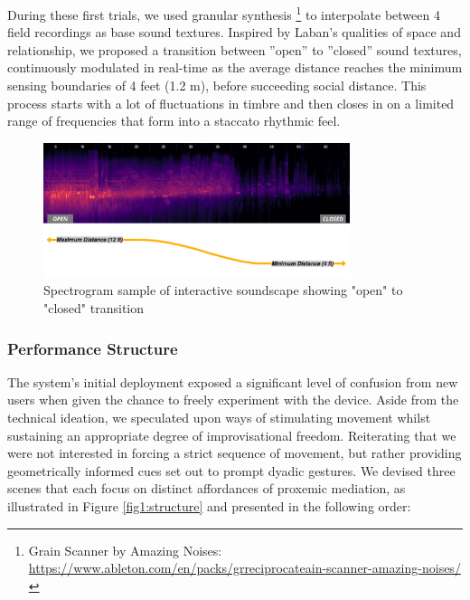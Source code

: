 During these first trials, we used granular synthesis \footnote{{Grain Scanner
by Amazing Noises: \url{https://www.ableton.com/en/packs/grreciprocateain-scanner-amazing-noises/}}} to interpolate between 4 field recordings as base sound textures. Inspired by Laban’s qualities of space and relationship, we proposed a transition between ”open” to ”closed” sound textures, continuously modulated in real-time as the average distance reaches the minimum sensing boundaries of 4 feet (1.2 m), before succeeding social distance. This process starts with a lot of fluctuations in timbre and then closes in on a limited range of frequencies that form into a staccato rhythmic feel.

\begin{figure}[!h]
\captionsetup{width=1.0\textwidth}
\centering
\includegraphics[width=0.8\textwidth,keepaspectratio]{Chapters/Figures/adse_ess/open_closed_examples_annotated_landscape_line_cont.png}
{\caption{Spectrogram sample of interactive soundscape showing "open" to "closed" transition}\label{fig:sound_examples}}
\end{figure}

\subsubsection{Performance Structure}
\label{sec:structure}

The system's initial deployment exposed a significant level of confusion from new users when given the chance to freely experiment with the device. Aside from the technical ideation, we speculated upon ways of stimulating movement whilst sustaining an appropriate degree of improvisational freedom. Reiterating that we were not interested in forcing a strict sequence of movement, but rather providing geometrically informed cues set out to prompt dyadic gestures. We devised three scenes that each focus on distinct affordances of proxemic mediation, as illustrated in Figure \ref{fig1:structure} and presented in the following order:

